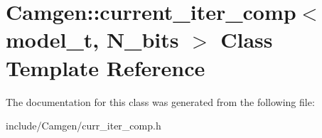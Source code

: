 \hypertarget{a00110}{}\section{Camgen\+:\+:current\+\_\+iter\+\_\+comp$<$ model\+\_\+t, N\+\_\+bits $>$ Class Template Reference}
\label{a00110}


The documentation for this class was generated from the following file\+:\begin{DoxyCompactItemize}
\item 
include/\+Camgen/curr\+\_\+iter\+\_\+comp.\+h\end{DoxyCompactItemize}

